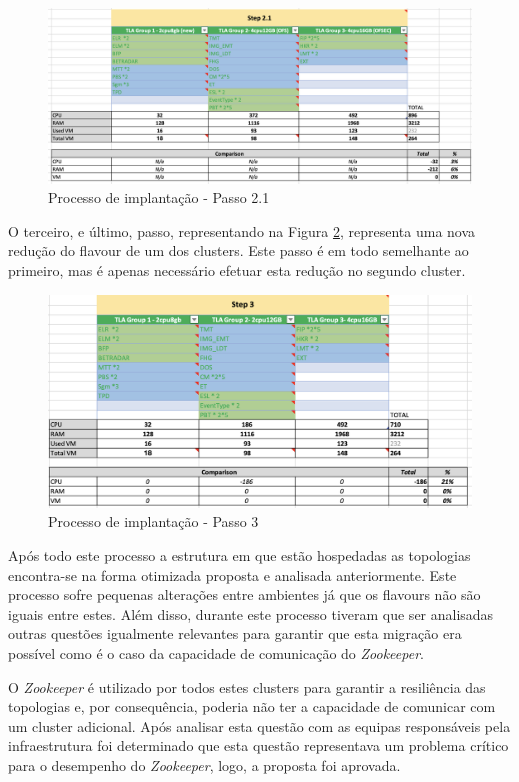 \begin{figure}[H]
  \centerline{\includegraphics[scale=0.4]{media/content/analise/strat-2_1.png}}
  \caption{Processo de implantação - Passo 2.1}
  \label{strat-2_1}
\end{figure}

O terceiro, e último, passo, representando na Figura \ref{strat-3}, representa uma nova redução 
do \gls{flavour} de um dos \glspl{cluster}. Este passo é em todo semelhante ao primeiro, mas é
apenas necessário efetuar esta redução no segundo \gls{cluster}.

\begin{figure}[H]
  \centerline{\includegraphics[scale=0.5]{media/content/analise/strat-3.png}}
  \caption{Processo de implantação - Passo 3}
  \label{strat-3}
\end{figure}

Após todo este processo a estrutura em que estão hospedadas as topologias encontra-se na forma
otimizada proposta e analisada anteriormente. Este processo sofre pequenas alterações entre
ambientes já que os \glspl{flavour} não são iguais entre estes. Além disso, durante este processo
tiveram que ser analisadas outras questões igualmente relevantes para garantir que esta migração
era possível como é o caso da capacidade de comunicação do \textit{Zookeeper}.

O \textit{Zookeeper} é utilizado por todos estes \glspl{cluster} para garantir a resiliência das 
topologias e, por consequência, poderia não ter a capacidade de comunicar com um \gls{cluster}
adicional. Após analisar esta questão com as equipas responsáveis pela infraestrutura foi 
determinado que esta questão representava um problema crítico para o desempenho do 
\textit{Zookeeper}, logo, a proposta foi aprovada.

